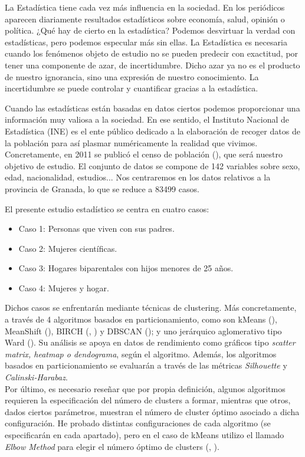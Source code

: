 La Estadística tiene cada vez más influencia en la sociedad. En los periódicos aparecen diariamente resultados estadísticos sobre economía, salud, opinión o política. ¿Qué hay de cierto en la estadística? Podemos desvirtuar la verdad con estadísticas, pero podemos especular más sin ellas. La Estadística es necesaria cuando los fenómenos objeto de estudio no se pueden predecir con exactitud, por tener una componente de azar, de incertidumbre. Dicho azar ya no es el producto de nuestro ignorancia, sino una expresión de nuestro conocimiento. La incertidumbre se puede controlar y cuantificar gracias a la estadística.

Cuando las estadísticas están basadas en datos ciertos podemos proporcionar una información muy valiosa a la sociedad. En ese sentido, el Instituto Nacional de Estadística (INE) es el ente público dedicado a la elaboración de recoger datos de la población para así plasmar numéricamente la realidad que vivimos. Concretamente, en 2011 se publicó el censo de población (\cite{censo}), que será nuestro objetivo de estudio. El conjunto de datos se compone de 142 variables sobre sexo, edad, nacionalidad, estudios... Nos centraremos en los datos relativos a la provincia de Granada, lo que se reduce a 83499 casos. 

El presente estudio estadístico se centra en cuatro casos:
\begin{itemize}
	\item Caso 1: Personas que viven con sus padres. 
	\item Caso 2: Mujeres científicas.
	\item Caso 3: Hogares biparentales con hijos menores de 25 años.
	\item Caso 4: Mujeres y hogar.
\end{itemize}

Dichos casos se enfrentarán mediante técnicas de clustering. Más concretamente, a través de 4 algoritmos basados en particionamiento, como son kMeans (\cite{kmeans}), MeanShift (\cite{ms}), BIRCH (\cite{birch}, \cite{zhang1996birch}) y DBSCAN (\cite{dbscan}); y uno jerárquico aglomerativo tipo Ward (\cite{ward}). Su análisis se apoya en datos de rendimiento como gráficos tipo \textit{scatter matrix, heatmap o dendograma}, según el algoritmo. Además, los algoritmos basados en particionamiento se evaluarán a través de las métricas \textit{Silhouette} y \textit{Calinski-Harabaz}. \\

Por último, es necesario reseñar que por propia definición, algunos algoritmos requieren la especificación del número de clusters a formar, mientras que otros, dados ciertos parámetros, muestran el número de cluster óptimo asociado a dicha configuración. He probado distintas configuraciones de cada algoritmo (se especificarán en cada apartado), pero en el caso de kMeans utilizo el llamado \textit{Elbow Method} para elegir el número óptimo de clusters (\cite{elbow-method}, \cite{elbow-method1}).

